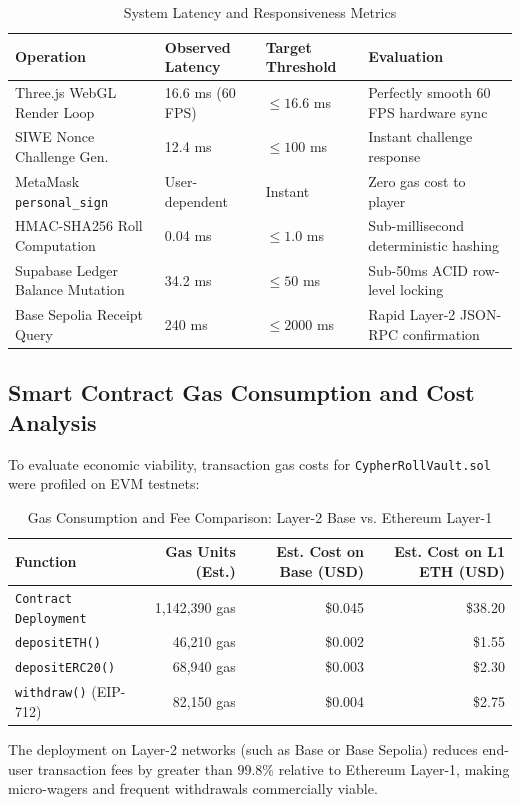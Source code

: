 \begin{table}[h!]
\centering
\renewcommand{\arraystretch}{1.25}
\begin{tabularx}{\textwidth}{@{} l l l X @{}}
\toprule
\textbf{Operation} & \textbf{Observed Latency} & \textbf{Target Threshold} & \textbf{Evaluation} \\
\midrule
Three.js WebGL Render Loop & 16.6 ms (60 FPS) & $\le 16.6$ ms & Perfectly smooth 60 FPS hardware sync \\
SIWE Nonce Challenge Gen. & 12.4 ms & $\le 100$ ms & Instant challenge response \\
MetaMask \texttt{personal\_sign} & User-dependent & Instant & Zero gas cost to player \\
HMAC-SHA256 Roll Computation & 0.04 ms & $\le 1.0$ ms & Sub-millisecond deterministic hashing \\
Supabase Ledger Balance Mutation & 34.2 ms & $\le 50$ ms & Sub-50ms ACID row-level locking \\
Base Sepolia Receipt Query & 240 ms & $\le 2000$ ms & Rapid Layer-2 JSON-RPC confirmation \\
\bottomrule
\end{tabularx}
\caption{System Latency and Responsiveness Metrics}
\end{table}

\subsection{Smart Contract Gas Consumption and Cost Analysis}
To evaluate economic viability, transaction gas costs for \texttt{CypherRollVault.sol} were profiled on EVM testnets:

\begin{table}[h!]
\centering
\renewcommand{\arraystretch}{1.25}
\begin{tabular}{@{} l r r r @{}}
\toprule
\textbf{Function} & \textbf{Gas Units (Est.)} & \textbf{Est. Cost on Base (USD)} & \textbf{Est. Cost on L1 ETH (USD)} \\
\midrule
\texttt{Contract Deployment} & 1,142,390 gas & \$0.045 & \$38.20 \\
\texttt{depositETH()} & 46,210 gas & \$0.002 & \$1.55 \\
\texttt{depositERC20()} & 68,940 gas & \$0.003 & \$2.30 \\
\texttt{withdraw()} (EIP-712) & 82,150 gas & \$0.004 & \$2.75 \\
\bottomrule
\end{tabular}
\caption{Gas Consumption and Fee Comparison: Layer-2 Base vs. Ethereum Layer-1}
\end{table}

The deployment on Layer-2 networks (such as Base or Base Sepolia) reduces end-user transaction fees by greater than $99.8\%$ relative to Ethereum Layer-1, making micro-wagers and frequent withdrawals commercially viable.
